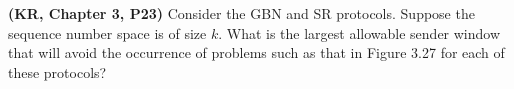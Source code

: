\documentclass[a4paper,11pt]{exam}
\begin{document}
\begin{questions}

	\question \textbf{(KR, Chapter 3, P23)} 
	Consider the GBN and SR protocols. Suppose the sequence
	number space is of size $k$. What is the largest allowable sender window that
	will avoid the occurrence of problems such as that in Figure 3.27 for each of
	these protocols?

    \end{questions}
\end{document}
